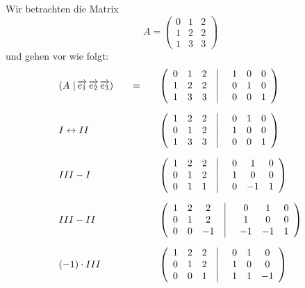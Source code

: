 \begin{beispiel} Wir betrachten die Matrix  
  	$$ A = \left(\begin{matrix} 0 & 1 & 2 \\ 1 & 2 & 2 \\ 1 & 3 & 3 \end{matrix} \right) $$
und gehen vor wie folgt:
  	$$ \begin{array} {l c l}
     	\left( A \, \, \vert \, \vektor{e_1} \, \vektor{e_2} \, \vektor{e_3} \right) 
      & \quad = \quad & 
     	\left(\begin{array} {c c c | c c c} 0 & 1 & 2 \phantom{x} &  \quad 1 & 0 & 0 \\ 
	1 & 2 & 2 \phantom{x} &  \quad 0 & 1 & 0 \\ 
	1 & 3 & 3 \phantom{x} &  \quad 0 & 0 & 1  \end{array} \right) \\[2.2em]
      I \leftrightarrow II & & 
     	\left(\begin{array} {c c c | c c c} 1 & 2 & 2 \phantom{x} &  \quad 0 & 1 & 0 \\ 
	0 & 1 & 2 \phantom{x} &  \quad 1 & 0 & 0 \\ 
	1 & 3 & 3 \phantom{x} &  \quad 0 & 0 & 1 \end{array} \right) \\[2.2em]
      III - I & & 
     	\left(\begin{array} {c c c | c c c} 1 & 2 & 2 \phantom{x} &  \quad 0 & 1 & 0 \\ 
	0 & 1 & 2 \phantom{x} &  \quad 1 & 0 & 0 \\ 
	0 & 1 & 1 \phantom{x} &  \quad 0 & -1 & 1 \end{array} \right) \\[2.2em]
   	III - II & & 
     	\left(\begin{array} {c c c | c c c} 1 & 2 & 2 \phantom{x} &  \quad 0 & 1 & 0 \\ 
	0 & 1 & 2 \phantom{x} &  \quad 1 & 0 & 0 \\ 
	0 & 0 & -1 \phantom{x} &  \quad -1 & -1 & 1\end{array} \right) \\[2.2em]
  	(-1) \cdot III & & 
 	\left(\begin{array} {c c c | c c c} 1 & 2 & 2 \phantom{x} &  \quad 0 & 1 & 0 \\ 
	0 & 1 & 2 \phantom{x} &  \quad 1 & 0 & 0 \\ 
	0 & 0 &  1 \phantom{x} &  \quad  1 &  1 & -1  \end{array} \right) \\[2.2em]

\end{array}$$
\end{beispiel}
